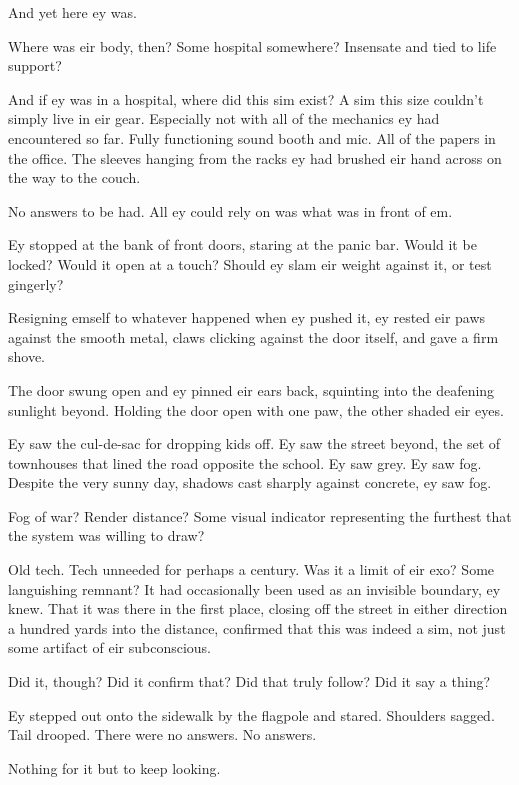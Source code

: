 And yet here ey was.

Where was eir body, then? Some hospital somewhere? Insensate and tied to life support?

And if ey was in a hospital, where did this sim exist? A sim this size couldn't simply live in eir gear. Especially not with all of the mechanics ey had encountered so far. Fully functioning sound booth and mic. All of the papers in the office. The sleeves hanging from the racks ey had brushed eir hand across on the way to the couch.

No answers to be had. All ey could rely on was what was in front of em.

Ey stopped at the bank of front doors, staring at the panic bar. Would it be locked? Would it open at a touch? Should ey slam eir weight against it, or test gingerly?

Resigning emself to whatever happened when ey pushed it, ey rested eir paws against the smooth metal, claws clicking against the door itself, and gave a firm shove.

The door swung open and ey pinned eir ears back, squinting into the deafening sunlight beyond. Holding the door open with one paw, the other shaded eir eyes.

Ey saw the cul-de-sac for dropping kids off. Ey saw the street beyond, the set of townhouses that lined the road opposite the school. Ey saw grey. Ey saw fog. Despite the very sunny day, shadows cast sharply against concrete, ey saw fog.

Fog of war? Render distance? Some visual indicator representing the furthest that the system was willing to draw?

Old tech. Tech unneeded for perhaps a century. Was it a limit of eir exo? Some languishing remnant? It had occasionally been used as an invisible boundary, ey knew. That it was there in the first place, closing off the street in either direction a hundred yards into the distance, confirmed that this was indeed a sim, not just some artifact of eir subconscious.

Did it, though? Did it confirm that? Did that truly follow? Did it say a thing?

Ey stepped out onto the sidewalk by the flagpole and stared. Shoulders sagged. Tail drooped. There were no answers. No answers.

Nothing for it but to keep looking.
